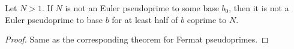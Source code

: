 \documentclass[a4paper, 10pt]{amsart}
\begin{document}
\begin{theorem}
 Let $N >1$. If $N$ is not an Euler pseudoprime to some base $b_0$, then it is not a Euler pseudoprime to base $b$ for at least half of $b$ coprime to $N$. 
\end{theorem}
\begin{proof}
  Same as the corresponding theorem for Fermat pseudoprimes.
\end{proof}

\end{document}
